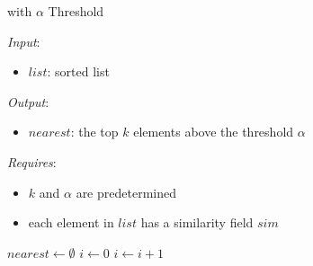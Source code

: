 \begin{algorithm}[H]
\caption{\kNN{} with $\alpha$ Threshold}\label{alg:filter}
\textit{Input}:
    \begin{itemize}
    \item $list$: sorted list
    \end{itemize}
\textit{Output}:
    \begin{itemize}
    \item $nearest$: the top $k$ elements above the threshold $\alpha$
    \end{itemize}
\textit{Requires}:
    \begin{itemize}
    \item $k$ and $\alpha$ are predetermined
    \item each element in $list$ has a similarity field $sim$
    \end{itemize}

\begin{algorithmic}[1]
\State $nearest\gets\emptyset$
\State $i\gets0$
\State {}
\State $i\gets i + 1$
\EndWhile
\State{}
\EndProcedure
\end{algorithmic}
\end{algorithm}